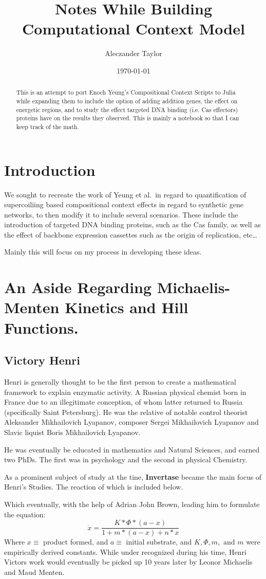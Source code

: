 \documentclass{article}
\title{Notes While Building Computational Context Model}
\author{Aleczander Taylor}
\date{\today}
\begin{document}
\maketitle
\begin{abstract}
  This is an attempt to port Enoch Yeung's Compositional Context Scripts to Julia while 
  expanding them to include the option of adding addition genes, the effect on energetic 
  regions, and to study the effect targeted DNA binding (i.e. Cas effectors) proteins
  have on the results they observed. This is mainly a notebook so that I can keep track of
  the math.
\end{abstract}

\section{Introduction}
  We sought to recreate the work of Yeung et al.\ in regard to quantification of
  supercoiliing based compositional context effects in regard to synthetic gene networks,
  to then modify it to include several scenarios. These include the introduction of
  targeted DNA binding proteins, such as the Cas family, as well as the effect of backbone
  expression cassettes such as the origin of replication, etc\dots

  Mainly this will focus on my process in developing these ideas.
  
\section{An Aside Regarding Michaelis-Menten Kinetics and Hill Functions.}
\subsection{Victory Henri}
  Henri is generally thought to be the first person to create a mathematical framework to 
  explain enzymatic activity. A Russian physical chemist born in France due to an
  illegitimate conception, of whom latter returned to Russia (specifically Saint 
  Petersburg). He was the relative of notable control theorist Aleksander Mikhailovich Lyapanov, 
  composer Sergei Mikhailovich Lyapanov and Slavic liquist Boris Mikhailovich Lyapanov.

  He was eventually be educated in mathematics and Natural Sciences, and earned two PhDs. The first was in 
  psychology and the second in physical Chemistry.

  As a prominent subject of study at the tine, \textbf{Invertase} became the main focus 
  of Henri's Studies. The reaction of which is included below.
  \begin{figure}
    \tiny {}
  \end{figure}
  Which eventually, with the help of Adrian John Brown, leading him to formulate the equation:
  \[
  \dot{x} = \frac{K*\Phi*(a-x)}{1+m*(a-x)+n*x}  
  \]
  Where $x \equiv$ product formed, and $a \equiv$ initial substrate, and $K, \Phi, m, \text{ and } m$ 
  were empirically derived constants. While under recognized during his time, Henri Victors 
  work would eventually be picked up 10 years later by Leonor Michaelis and Maud Menten.
\end{document}
